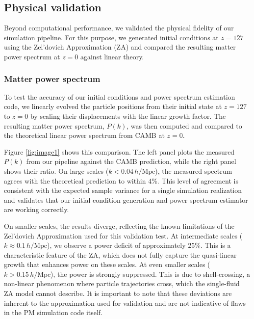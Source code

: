 \documentclass[]{article}
\begin{document}
\subsection{Physical validation}
Beyond computational performance, we validated the physical fidelity of our simulation pipeline. For this purpose, we generated initial conditions at $z=127$ using the Zel'dovich Approximation (ZA) and compared the resulting matter power spectrum at $z=0$ against linear theory.

\subsubsection{Matter power spectrum}
To test the accuracy of our initial conditions and power spectrum estimation code, we linearly evolved the particle positions from their initial state at $z=127$ to $z=0$ by scaling their displacements with the linear growth factor. The resulting matter power spectrum, $P(k)$, was then computed and compared to the theoretical linear power spectrum from CAMB at $z=0$.

Figure \ref{fig:image1} shows this comparison. The left panel plots the measured $P(k)$ from our pipeline against the CAMB prediction, while the right panel shows their ratio. On large scales ($k < 0.04 \, h/\text{Mpc}$), the measured spectrum agrees with the theoretical prediction to within 4\%. This level of agreement is consistent with the expected sample variance for a single simulation realization and validates that our initial condition generation and power spectrum estimator are working correctly.

On smaller scales, the results diverge, reflecting the known limitations of the Zel'dovich Approximation used for this validation test. At intermediate scales ($k \approx 0.1 \, h/\text{Mpc}$), we observe a power deficit of approximately 25\%. This is a characteristic feature of the ZA, which does not fully capture the quasi-linear growth that enhances power on these scales. At even smaller scales ($k > 0.15 \, h/\text{Mpc}$), the power is strongly suppressed. This is due to shell-crossing, a non-linear phenomenon where particle trajectories cross, which the single-fluid ZA model cannot describe. It is important to note that these deviations are inherent to the approximation used for validation and are not indicative of flaws in the PM simulation code itself.
\end{document}
